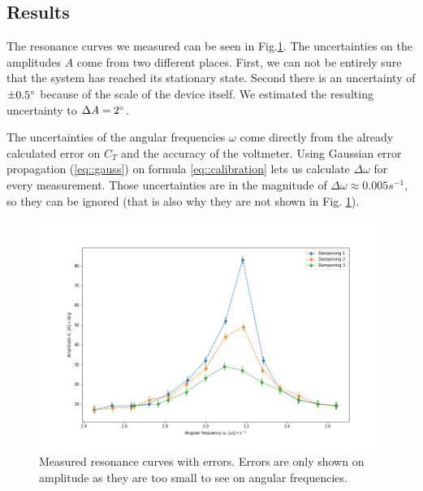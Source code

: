 \subsection{Results}
The resonance curves we measured can be seen in Fig.\ref{fig::resonance}.
The uncertainties on the amplitudes $A$ come from two different places.
First, we can not be entirely sure that the system has reached its stationary state.
Second there is an uncertainty of $\pm 0.5 \degree$ because of the scale of the device itself.
We estimated the resulting uncertainty to $\Delta A = 2 \degree$.

The uncertainties of the angular frequencies $\omega$ come directly from the already calculated error on $C_T$ and the accuracy of the voltmeter.
Using Gaussian error propagation (\ref{eq::gauss}) on formula \ref{eq::calibration} lets us calculate $\Delta \omega$ for every measurement. 
Those uncertainties are in the magnitude of $\Delta \omega \approx 0.005 s^{-1}$, so they can be ignored (that is also why they are not shown in Fig. \ref{fig::resonance}).

\begin{figure} [ht]
	\centering
	\includegraphics[width=350pt]{python/resonance.PNG}
	\caption{Measured resonance curves with errors. Errors are only shown on amplitude as they are too small to see on angular frequencies.}
	\label{fig::resonance}
\end{figure}
